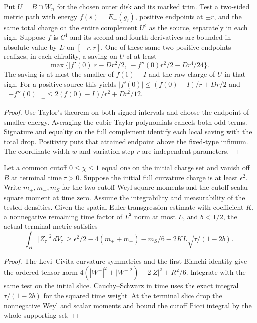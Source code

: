 \begin{theorem}
\label{thm:ed03-selected-side-variation}
\leanok
Put $U=B\cap W_n$ for the chosen outer disk and its marked trim. Test
a two-sided metric path with energy $f(s)=E_+(g_s)$, positive endpoints
at $\pm r$, and the same total charge on the entire complement $U^c$
as the source, separately in each sign. Suppose $f$ is $C^4$ and its
second and fourth derivatives are bounded in absolute value by $D$ on
$[-r,r]$. One of these same two positive endpoints realizes, in each
chirality, a saving on $U$ of at least
\[
 \max\{ |f'(0)|r-Dr^2/2,\;-f''(0)r^2/2-Dr^4/24\}.
\]
The saving is at most the smaller of $f(0)-I$ and the raw charge of $U$
in that sign. For a positive source this yields
$|f'(0)|\le (f(0)-I)/r+Dr/2$ and
$[-f''(0)]_+\le2(f(0)-I)/r^2+Dr^2/12$.
\end{theorem}
\begin{proof}
\leanok
Use Taylor's theorem on both signed intervals and choose the endpoint of
smaller energy. Averaging the cubic Taylor polynomials cancels both odd
terms. Signature and equality on the full complement identify each local
saving with the total drop. Positivity puts that attained endpoint above
the fixed-type infimum. The coordinate width $w$ and variation step $r$
are independent parameters.
\end{proof}

\begin{theorem}
\label{thm:ed03-modified-euler-transport}
\leanok
Let a common cutoff $0\le\chi\le1$ equal one on the initial charge set
and vanish off $B$ at terminal time $\tau>0$. Suppose the initial full
curvature charge is at least $\epsilon^2$. Write $m_+,m_-,m_S$ for
the two cutoff Weyl-square moments and the cutoff scalar-square moment at
time zero. Assume the integrability and measurability of the tested
densities. Given the spatial Euler transgression estimate with coefficient
$K$, a nonnegative remaining time factor of $L^2$ norm at most $L$, and
$b<1/2$, the actual terminal metric satisfies
\[
 \int_B |Z_\tau|^2\,dV_\tau\ \ge \epsilon^2/2-4(m_++m_-)-m_S/6-2KL\sqrt{\tau/(1-2b)}.
\]
\end{theorem}
\begin{proof}
\leanok
The Levi--Civita curvature symmetries and the first Bianchi identity
give the ordered-tensor norm $4(|W^+|^2+|W^-|^2)+2|Z|^2+R^2/6$.
Integrate with the same test on the initial slice. Cauchy--Schwarz in
time uses the exact integral $\tau/(1-2b)$ for the squared time
weight. At the terminal slice drop the nonnegative Weyl and scalar
moments and bound the cutoff Ricci integral by the whole supporting set.
\end{proof}
